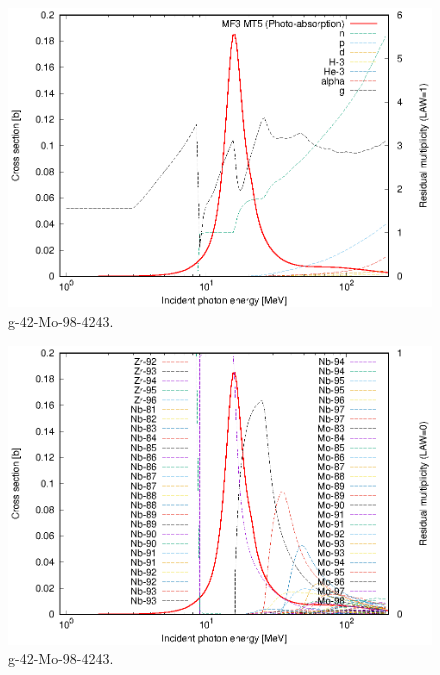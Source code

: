\begin{figure}
 \includegraphics[width=\linewidth]{eps/g_42-Mo-98_4243.eps}
  \caption{g-42-Mo-98-4243.}
\end{figure}
\begin{figure}
 \includegraphics[width=\linewidth]{eps-law0/g_42-Mo-98_4243.eps}
 \caption{g-42-Mo-98-4243.}
\end{figure}
\newpage \clearpage

